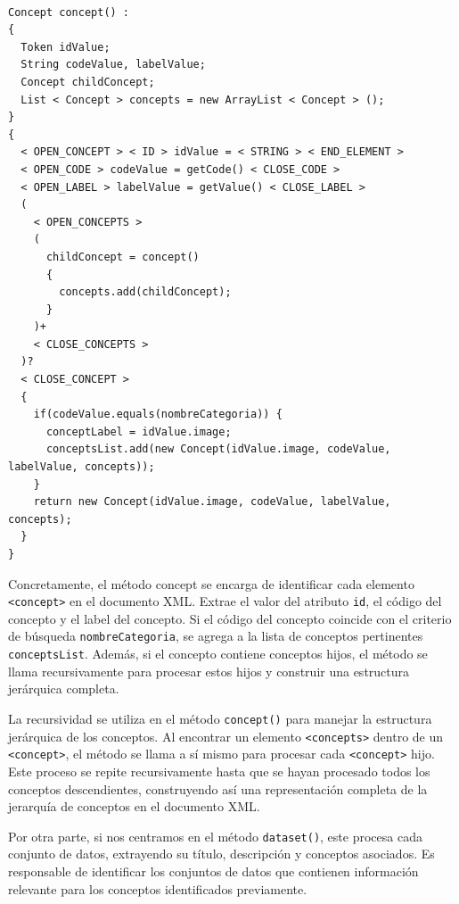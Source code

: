 \lstset{inputencoding=utf8/latin1}
\begin{lstlisting}
    
Concept concept() :
{
  Token idValue;
  String codeValue, labelValue;
  Concept childConcept; 
  List < Concept > concepts = new ArrayList < Concept > ();
}
{
  < OPEN_CONCEPT > < ID > idValue = < STRING > < END_ELEMENT > 
  < OPEN_CODE > codeValue = getCode() < CLOSE_CODE > 
  < OPEN_LABEL > labelValue = getValue() < CLOSE_LABEL >
  (
    < OPEN_CONCEPTS >
    (
      childConcept = concept()
      {
        concepts.add(childConcept);
      }
    )+
    < CLOSE_CONCEPTS >
  )?
  < CLOSE_CONCEPT >
  {
    if(codeValue.equals(nombreCategoria)) {
      conceptLabel = idValue.image;
      conceptsList.add(new Concept(idValue.image, codeValue, labelValue, concepts));
	}
	return new Concept(idValue.image, codeValue, labelValue, concepts);
  }
}

\end{lstlisting}

Concretamente, el método concept se encarga de identificar cada elemento \lstinline|<concept>| en el documento XML. Extrae el valor del atributo \lstinline|id|, el código del concepto y el label del concepto. Si el código del concepto coincide con el criterio de búsqueda \lstinline|nombreCategoria|, se agrega a la lista de conceptos pertinentes \lstinline|conceptsList|. Además, si el concepto contiene conceptos hijos, el método se llama recursivamente para procesar estos hijos y construir una estructura jerárquica completa.

La recursividad se utiliza en el método \lstinline|concept()| para manejar la estructura jerárquica de los conceptos. Al encontrar un elemento \lstinline|<concepts>| dentro de un \lstinline|<concept>|, el método se llama a sí mismo para procesar cada \lstinline|<concept>| hijo. Este proceso se repite recursivamente hasta que se hayan procesado todos los conceptos descendientes, construyendo así una representación completa de la jerarquía de conceptos en el documento XML.

Por otra parte, si nos centramos en el método \lstinline|dataset()|, este  procesa cada conjunto de datos, extrayendo su título, descripción y conceptos asociados. Es responsable de identificar los conjuntos de datos que contienen información relevante para los conceptos identificados previamente.

